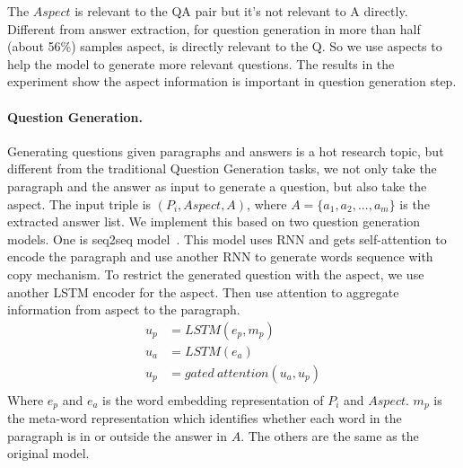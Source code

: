 The $Aspect$ is relevant to the QA pair but it's not relevant to A directly. Different from answer extraction, for question generation in more than half (about 56\%) samples aspect, is directly relevant to the Q. So we use aspects to help the model to generate more relevant questions. The results in the experiment show the aspect information is important in question generation step.
\paragraph{Question Generation.} Generating questions given paragraphs and answers is a hot research topic, but different from the traditional Question Generation tasks, we not only take the paragraph and the answer as input to generate a question, but also take the aspect. The input triple is $(P_i, Aspect, A)$, where $A=\{a_1,a_2,...,a_m\}$ is the extracted answer list. We implement this based on two question generation models. One is seq2seq model~\cite{zhao2018paragraph}. This model uses RNN and gets self-attention to encode the paragraph and use another RNN to generate words sequence with copy mechanism. To restrict the generated question with the aspect, we use another LSTM encoder for the aspect. Then use attention to aggregate information from aspect to the paragraph.
\begin{equation}
\begin{aligned}
u_{p} &= LSTM(e_{p}, m_{p}) \\
u_{a} &= LSTM(e_{a}) \\
u_{p} &= gated\ attention(u_{a}, u_{p})\\
\end{aligned}
\end{equation}
Where $e_p$ and $e_a$ is the word embedding representation of  $P_i$ and $Aspect$. $m_p$ is the meta-word representation which identifies whether each word in the paragraph is in or outside the answer in $A$. The others are the same as the original model.

